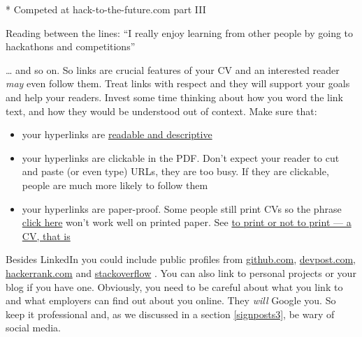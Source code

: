 \documentclass[
]{book}
\newenvironment{Shaded}{\begin{snugshade}}{\end{snugshade}}
\newcommand{\NormalTok}[1]{#1}
\newcommand{\SpecialStringTok}[1]{\textcolor[rgb]{0.31,0.60,0.02}{#1}}
\providecommand{\tightlist}{%
  \setlength{\itemsep}{0pt}\setlength{\parskip}{0pt}}
\begin{document}
\begin{Shaded}
\begin{Highlighting}[]
\SpecialStringTok{* }\NormalTok{Competed at hack{-}to{-}the{-}future.com part III}
\end{Highlighting}
\end{Shaded}

Reading between the lines: ``I really enjoy learning from other people by going to hackathons and competitions''

\ldots{} and so on. So links are crucial features of your CV and an interested reader \emph{may} even follow them. Treat links with respect and they will support your goals and help your readers. Invest some time thinking about how you word the link text, and how they would be understood out of context. Make sure that:

\begin{itemize}
\tightlist
\item
  your hyperlinks are \href{https://readabilityguidelines.co.uk/content-design/links/}{readable and descriptive} \citep{readable}\\
\item
  your hyperlinks are clickable in the PDF. Don't expect your reader to cut and paste (or even type) URLs, they are too busy. If they are clickable, people are much more likely to follow them
\item
  your hyperlinks are paper-proof. Some people still print CVs so the phrase \href{https://www.w3.org/QA/Tips/noClickHere}{click here} won't work well on printed paper. See \href{https://www.bbc.com/worklife/article/20140620-to-print-or-not-to-print}{to print or not to print --- a CV, that is} \citep{printcv}
\end{itemize}

Besides LinkedIn you could include public profiles from \href{https://docs.github.com/en/free-pro-team@latest/github/setting-up-and-managing-your-github-profile/about-your-profile}{github.com}, \href{https://help.devpost.com/hc/en-us/articles/360021734632-Update-your-profile-and-username}{devpost.com}, \href{https://www.hackerrank.com/leaderboard}{hackerrank.com} and \href{https://medium.com/@rhamedy/contribution-debt-why-how-to-contribute-to-stack-overflow-a69d4bd50d0c}{stackoverflow} \citep{stackoverflow}. You can also link to personal projects or your blog if you have one. Obviously, you need to be careful about what you link to and what employers can find out about you online. They \emph{will} Google you. So keep it professional and, as we discussed in a section \ref{signposts3}, be wary of social media.
\end{document}
